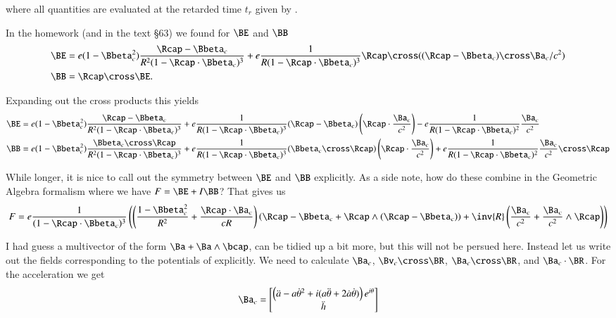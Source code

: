 {where all quantities are evaluated at the retarded time \(t_r\) given by .

In the homework (and in the text \citep{landau1980classical} \S 63) we found for \(\BE\) and \(\BB\)
%
\begin{equation}\label{eqn:relativisticElectrodynamicsExamReflection:920}
\begin{aligned}
\BE &= e (1 - \Bbeta_c^2) \frac{\Rcap - \Bbeta_c}{R^2 (1 - \Rcap \cdot \Bbeta_c)^3}
+ e \frac{1}{R (1 - \Rcap \cdot \Bbeta_c)^3} \Rcap \cross ((\Rcap - \Bbeta_c) \cross \Ba_c/c^2) \\
\BB &= \Rcap \cross \BE.
\end{aligned}
\end{equation}

Expanding out the cross products this yields
%
\begin{equation}\label{eqn:relativisticElectrodynamicsExamReflection:930}
\begin{aligned}
\BE
&= e (1 - \Bbeta_c^2) \frac{\Rcap - \Bbeta_c}{R^2 (1 - \Rcap \cdot \Bbeta_c)^3}
+ e \frac{1}{R (1 - \Rcap \cdot \Bbeta_c)^3} (\Rcap - \Bbeta_c) \left(\Rcap \cdot \frac{\Ba_c}{c^2}\right)
- e \frac{1}{R (1 - \Rcap \cdot \Bbeta_c)^2} \frac{\Ba_c}{c^2} \\
\BB
&= e (1 - \Bbeta_c^2) \frac{\Bbeta_c \cross \Rcap}{R^2 (1 - \Rcap \cdot \Bbeta_c)^3}
+ e \frac{1}{R (1 - \Rcap \cdot \Bbeta_c)^3} (\Bbeta_c \cross \Rcap) \left(\Rcap \cdot \frac{\Ba_c}{c^2} \right)
+ e \frac{1}{R (1 - \Rcap \cdot \Bbeta_c)^2} \frac{\Ba_c}{c^2} \cross \Rcap
\end{aligned}
\end{equation}

While longer, it is nice to call out the symmetry between \(\BE\) and \(\BB\) explicitly.  As a side note, how do these combine in the Geometric Algebra formalism where we have \(F = \BE + I\BB\)?  That gives us
%
\begin{equation}\label{eqn:relativisticElectrodynamicsExamReflection:935}
F =
e \frac{1}{(1 - \Rcap \cdot \Bbeta_c)^3}
\left(
\left(
\frac{1 - \Bbeta_c^2}{R^2} + \frac{\Rcap \cdot \Ba_c}{c R}
\right)
\left(
\Rcap - \Bbeta_c + \Rcap \wedge (\Rcap - \Bbeta_c)
\right)
+ \inv{R} \left(
\frac{\Ba_c}{c^2}
+ \frac{\Ba_c}{c^2} \wedge \Rcap
\right)
\right)
\end{equation}

I had guess a multivector of the form \(\Ba + \Ba \wedge \bcap\), can be tidied up a bit more, but this will not be persued here.  Instead let us write out the fields corresponding to the potentials of  explicitly.  We need to calculate \(\Ba_c\), \(\Bv_c \cross \BR\), \(\Ba_c \cross \BR\), and \(\Ba_c \cdot \BR\).  For the acceleration we get
%
\begin{equation}\label{eqn:relativisticElectrodynamicsExamReflection:940}
\Ba_c =
\begin{bmatrix}
\left( \ddot{a} - a {\dot{\theta}}^2 + i ( a\ddot{\theta} + 2 \dot{a} \dot{\theta} ) \right) e^{i\theta} \\
\ddot{h}
\end{bmatrix}
\end{equation}

}
